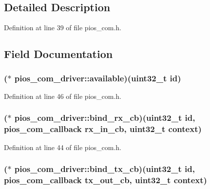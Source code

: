 \subsection{Detailed Description}


Definition at line 39 of file pios\-\_\-com.\-h.



\subsection{Field Documentation}
\hypertarget{structpios__com__driver_ad9a0f07f6ebff7536ed37a97d4c41608}{
\subsubsection[{available}]{($\ast$ pios\-\_\-com\-\_\-driver\-::available)({\bf uint32\-\_\-t} {\bf id})}}\label{structpios__com__driver_ad9a0f07f6ebff7536ed37a97d4c41608}


Definition at line 46 of file pios\-\_\-com.\-h.

\hypertarget{structpios__com__driver_aed9041fdd757cf95e57c9d523e30fd57}{
\subsubsection[{bind\-\_\-rx\-\_\-cb}]{($\ast$ pios\-\_\-com\-\_\-driver\-::bind\-\_\-rx\-\_\-cb)({\bf uint32\-\_\-t} {\bf id}, {\bf pios\-\_\-com\-\_\-callback} rx\-\_\-in\-\_\-cb, {\bf uint32\-\_\-t} context)}}\label{structpios__com__driver_aed9041fdd757cf95e57c9d523e30fd57}


Definition at line 44 of file pios\-\_\-com.\-h.

\hypertarget{structpios__com__driver_a94f7de4245688ab695cca1564be28cd6}{
\subsubsection[{bind\-\_\-tx\-\_\-cb}]{($\ast$ pios\-\_\-com\-\_\-driver\-::bind\-\_\-tx\-\_\-cb)({\bf uint32\-\_\-t} {\bf id}, {\bf pios\-\_\-com\-\_\-callback} tx\-\_\-out\-\_\-cb, {\bf uint32\-\_\-t} context)}}\label{structpios__com__driver_a94f7de4245688ab695cca1564be28cd6}


